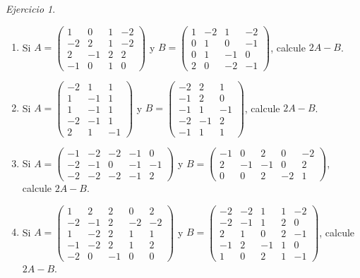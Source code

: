 \documentclass[12pt]{article}
\theoremstyle{remark}
\newtheorem{Ejer}[definicion]{Ejercicio}
\begin{document}
\begin{Ejer}
\begin{enumerate}[resume=banco]
\item Si $A=\begin{pmatrix}1&0&1&-2\\-2&2&1&-2\\2&-1&2&2\\-1&0&1&0\end{pmatrix}$ y $B=\begin{pmatrix}1&-2&1&-2\\0&1&0&-1\\0&1&-1&0\\2&0&-2&-1\end{pmatrix}$, calcule $2A-B$.

\item Si $A=\begin{pmatrix}-2&1&1\\1&-1&1\\1&-1&1\\-2&-1&1\\2&1&-1\end{pmatrix}$ y $B=\begin{pmatrix}-2&2&1\\-1&2&0\\-1&1&-1\\-2&-1&2\\-1&1&1\end{pmatrix}$, calcule $2A-B$.

\item Si $A=\begin{pmatrix}-1&-2&-2&-1&0\\-2&-1&0&-1&-1\\-2&-2&-2&-1&2\end{pmatrix}$ y $B=\begin{pmatrix}-1&0&2&0&-2\\2&-1&-1&0&2\\0&0&2&-2&1\end{pmatrix}$, calcule $2A-B$.

\item Si $A=\begin{pmatrix}1&2&2&0&2\\-2&-1&2&-2&-2\\1&-2&2&1&1\\-1&-2&2&1&2\\-2&0&-1&0&0\end{pmatrix}$ y $B=\begin{pmatrix}-2&-2&1&1&-2\\-2&-1&1&2&0\\2&1&0&2&-1\\-1&2&-1&1&0\\1&0&2&1&-1\end{pmatrix}$, calcule $2A-B$.

\end{enumerate}
\end{Ejer}
\end{document}
